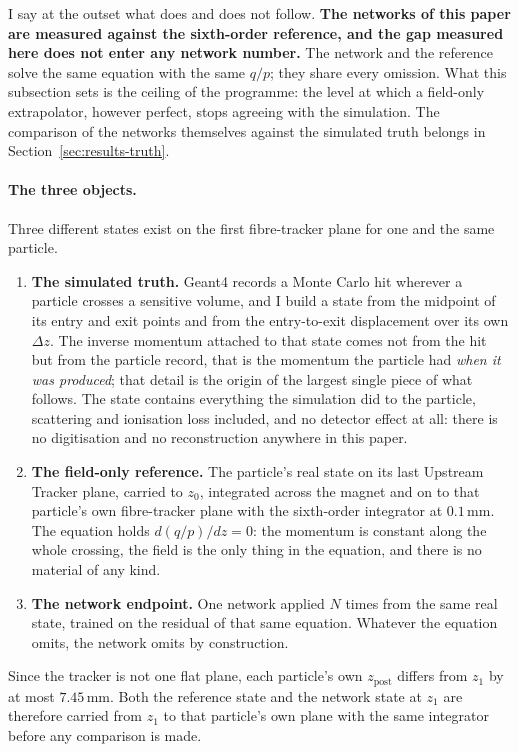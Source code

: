 \documentclass[11pt,a4paper]{article}
\newcommand{\mm}{\ensuremath{\,\mathrm{mm}}}
\begin{document}
I say at the outset what does and does not follow. \textbf{The networks of this
paper are measured against the sixth-order reference, and the gap measured here
does not enter any network number.} The network and the reference solve the same
equation with the same $q/p$; they share every omission. What this subsection
sets is the ceiling of the programme: the level at which a field-only
extrapolator, however perfect, stops agreeing with the simulation. The comparison
of the networks themselves against the simulated truth belongs in
Section~\ref{sec:results-truth}.

\paragraph{The three objects.} Three different states exist on the first
fibre-tracker plane for one and the same particle.
\begin{enumerate}\setlength{\itemsep}{2pt}
  \item \textbf{The simulated truth.} Geant4 records a Monte Carlo hit wherever
  a particle crosses a sensitive volume, and I build a state from the midpoint of
  its entry and exit points and from the entry-to-exit displacement over its own
  $\Delta z$. The inverse momentum attached to that state comes not from the hit
  but from the particle record, that is the momentum the particle had \emph{when
  it was produced}; that detail is the origin of the largest single piece of what
  follows. The state contains everything the simulation did to the particle,
  scattering and ionisation loss included, and no detector effect at all: there
  is no digitisation and no reconstruction anywhere in this paper.
  \item \textbf{The field-only reference.} The particle's real state on its last
  Upstream Tracker plane, carried to $z_0$, integrated across the magnet and on
  to that particle's own fibre-tracker plane with the sixth-order integrator at
  $0.1\mm$. The equation holds $d(q/p)/dz = 0$: the momentum is constant along
  the whole crossing, the field is the only thing in the equation, and there is
  no material of any kind.
  \item \textbf{The network endpoint.} One network applied $N$ times from the
  same real state, trained on the residual of that same equation. Whatever the
  equation omits, the network omits by construction.
\end{enumerate}
Since the tracker is not one flat plane, each particle's own $z_{\mathrm{post}}$
differs from $z_1$ by at most $7.45\mm$. Both the reference state and the network
state at $z_1$ are therefore carried from $z_1$ to that particle's own plane with
the same integrator before any comparison is made.
\end{document}
